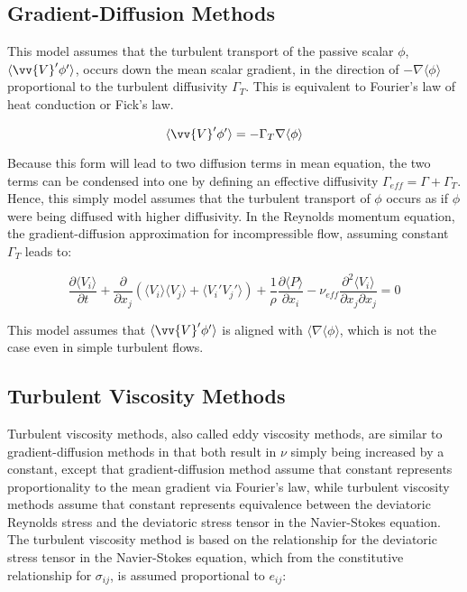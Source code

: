 \documentclass[10pt]{article}
\newcommand{\beq}{\begin{equation}}
\newcommand{\eeq}{\end{equation}}
\newcommand{\la}{\langle}
\newcommand{\ra}{\rangle}
\begin{document}
\begin{flushleft}
\subsection{Gradient-Diffusion Methods}
This model assumes that the turbulent transport of the passive scalar \(\phi\), \(\la \vv{V}'\phi'\ra\), occurs down the mean scalar gradient, in the direction of \(-\nabla\la\phi\ra\) proportional to the turbulent diffusivity \(\Gamma_T\). This is equivalent to Fourier's law of heat conduction or Fick's law.

\beq
\la\vv{V}'\phi'\ra=-\Gamma_T\nabla\la\phi\ra
\eeq

Because this form will lead to two diffusion terms in mean equation, the two terms can be condensed into one by defining an effective diffusivity \(\Gamma_{eff}=\Gamma+\Gamma_T\). Hence, this simply model assumes that the turbulent transport of \(\phi\) occurs as if \(\phi\) were being diffused with higher diffusivity. In the Reynolds momentum equation, the gradient-diffusion approximation for incompressible flow, assuming constant \(\Gamma_T\) leads to:

\beq
\frac{\partial \la V_i\ra}{\partial t}+\frac{\partial}{\partial x_j}\left(\la V_i\ra\la V_j\ra+\la V_i'V_j'\ra\right)+\frac{1}{\rho}\frac{\partial \la P\ra}{\partial x_i}-\nu_{eff}\frac{\partial^2 \la V_i\ra}{\partial x_j\partial x_j}=0
\eeq

This model assumes that \(\la \vv{V}'\phi'\ra\) is aligned with \(\la\nabla\la\phi\ra\), which is not the case even in simple turbulent flows. 






\subsection{Turbulent Viscosity Methods}
Turbulent viscosity methods, also called eddy viscosity methods, are similar to gradient-diffusion methods in that both result in \(\nu\) simply being increased by a constant, except that gradient-diffusion method assume that constant represents proportionality to the mean gradient via Fourier's law, while turbulent viscosity methods assume that constant represents equivalence between the deviatoric Reynolds stress and the deviatoric stress tensor in the Navier-Stokes equation. The turbulent viscosity method is based on the relationship for the deviatoric stress tensor in the Navier-Stokes equation, which from the constitutive relationship for \(\sigma_{ij}\), is assumed proportional to \(e_{ij}\):


\end{flushleft}
\end{document}
